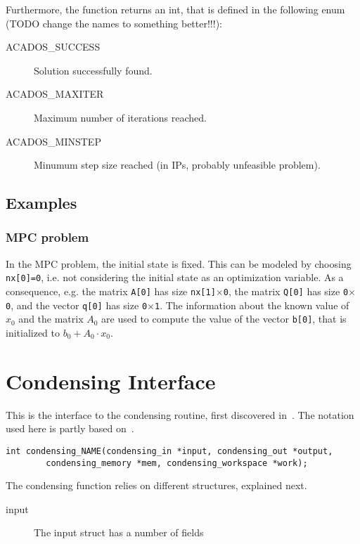 \documentclass{report}
\begin{document}
Furthermore, the function returns an int, that is defined in the following enum (TODO change the names to something better!!!):
\begin{description}
\item[ACADOS\_SUCCESS] Solution successfully found.
\item[ACADOS\_MAXITER] Maximum number of iterations reached.
\item[ACADOS\_MINSTEP] Minumum step size reached (in IPs, probably unfeasible problem).
\end{description}

\subsection{Examples}

\subsubsection{MPC problem}

In the MPC problem, the initial state is fixed.
This can be modeled by choosing {\tt nx[0]=0}, i.e. not considering the initial state as an optimization variable.
As a consequence, e.g. the matrix {\tt A[0]} has size {\tt nx[1]$\times$0}, the matrix {\tt Q[0]} has size {\tt 0$\times$0}, and the vector {\tt q[0]} has size {\tt 0$\times$1}.
The information about the known value of $x_0$ and the matrix $A_0$ are used to compute the value of the vector {\tt b[0]}, that is initialized to $b_0 + A_0 \cdot x_0$.

\section{Condensing Interface}

This is the interface to the condensing routine, first discovered in~\cite{Bock1984}. The notation used here is partly based on~\cite{Frasch2014a}.

\begin{verbatim}
int condensing_NAME(condensing_in *input, condensing_out *output,
        condensing_memory *mem, condensing_workspace *work);
\end{verbatim}

The condensing function relies on different structures, explained next.

\begin{description}
	\item[input] The input struct has a number of fields
\end{description}
\end{document}
